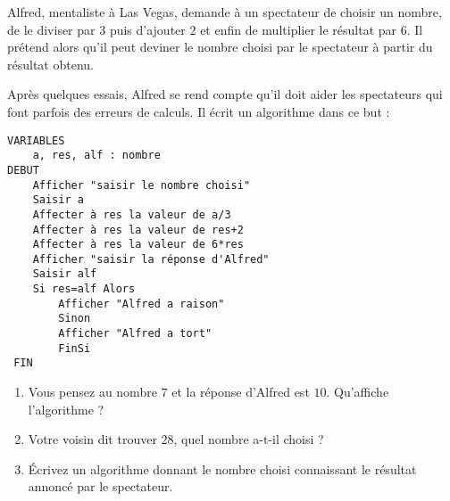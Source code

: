 \begin{exr}
Alfred, mentaliste à Las Vegas, demande à un spectateur de choisir un nombre, de le diviser par $3$ puis d'ajouter $2$ et enfin de multiplier le résultat par $6$. Il prétend alors qu'il peut deviner le nombre choisi par le spectateur à partir du résultat obtenu.

Après quelques essais, Alfred se rend compte qu'il doit aider les spectateurs qui font parfois des erreurs de calculs. Il écrit un algorithme dans ce but :
  \begin{Verbatim}[showtabs=false]
VARIABLES
	a, res, alf : nombre
DEBUT
	Afficher "saisir le nombre choisi"
	Saisir a
	Affecter à res la valeur de a/3
	Affecter à res la valeur de res+2 
	Affecter à res la valeur de 6*res
	Afficher "saisir la réponse d'Alfred"
	Saisir alf
	Si res=alf Alors
		Afficher "Alfred a raison"
		Sinon
		Afficher "Alfred a tort"
		FinSi
 FIN
  \end{Verbatim}
  \begin{enumerate}
  \item Vous pensez au nombre $7$ et la réponse d'Alfred est $10$. Qu'affiche l'algorithme ?
  \item Votre voisin dit trouver $28$, quel nombre a-t-il choisi ?
  \item %
  \'Ecrivez un algorithme donnant le nombre choisi connaissant le résultat annoncé par le spectateur. 
  \end{enumerate}
\end{exr}
%
%
%
